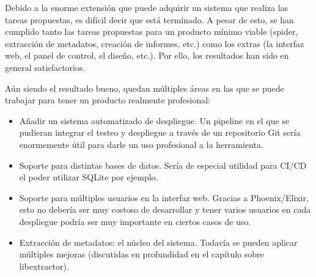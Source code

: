 Debido a la enorme extensión que puede adquirir un sistema que realiza las tareas propuestas, es difícil decir que está terminado. A pesar de esto, se han cumplido tanto las tareas propuestas para un producto mínimo viable (spider, extracción de metadatos, creación de informes, etc.) como los extras (la interfaz web, el panel de control, el diseño, etc.). Por ello, los resultados han sido en general satisfactorios.

Aún siendo el resultado bueno, quedan múltiples áreas en las que se puede trabajar para tener un producto realmente profesional:

\begin{itemize}
  \item Añadir un sistema automatizado de despliegue. Un pipeline en el que se pudieran integrar el testeo y despliegue a través de un repositorio Git sería enormemente útil para darle un uso profesional a la herramienta.
  \item Soporte para distintas bases de datos. Sería de especial utilidad para CI/CD el poder utilizar SQLite por ejemplo.
  \item Soporte para múltiples usuarios en la interfaz web. Gracias a Phoenix/Elixir, esto no debería ser muy costoso de desarrollar y tener varios usuarios en cada despliegue podría ser muy importante en ciertos casos de uso.
  \item Extracción de metadatos: el núcleo del sistema. Todavía se pueden aplicar múltiples mejoras (discutidas en profundidad en el capítulo sobre libextractor).
\end{itemize}